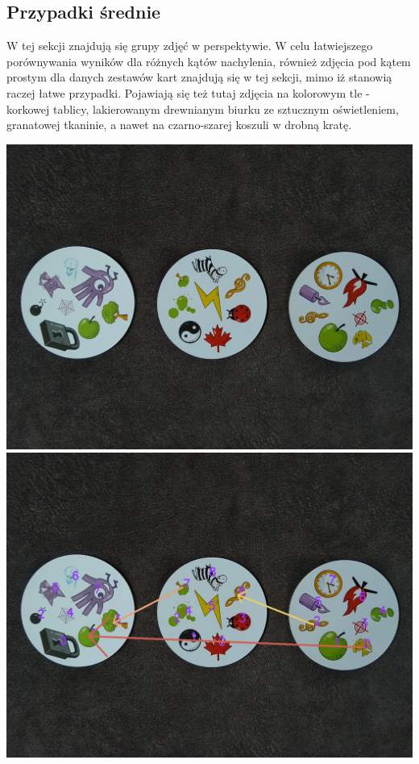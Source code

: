 \documentclass[10pt,a4paper]{article}
\begin{document}
\subsection{Przypadki średnie}
W tej sekcji znajdują się grupy zdjęć w perspektywie. W celu łatwiejszego porównywania wyników dla różnych kątów nachylenia, również zdjęcia pod kątem prostym dla danych zestawów kart znajdują się w tej sekcji, mimo iż stanowią raczej łatwe przypadki. Pojawiają się też tutaj zdjęcia na kolorowym tle - korkowej tablicy, lakierowanym drewnianym biurku ze sztucznym oświetleniem, granatowej tkaninie, a nawet na czarno-szarej koszuli w drobną kratę.
\newpage
\begin{center}
\includegraphics[scale=0.28]{medium/dobble05.jpg}
\includegraphics[scale=0.28]{medium/img_arrows0.jpg}\\

\end{center}
\end{document}

